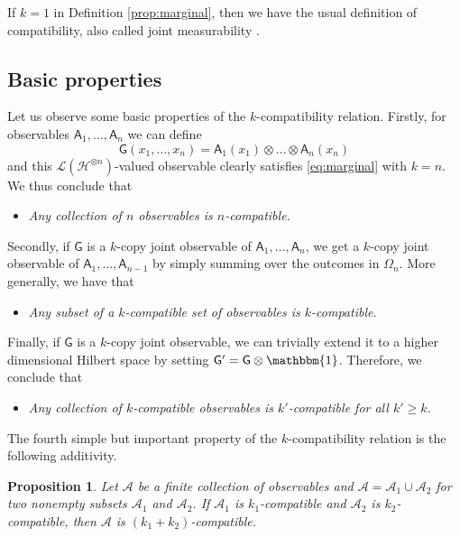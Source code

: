 \documentclass[12pt]{amsart}
\newtheorem{proposition}{Proposition}
\theoremstyle{definition}
\newcommand{\hh}{\mathcal{H}} %
\newcommand{\elle}[1]{\mathcal{L}(#1)} %
\newcommand{\id}{\mathbbm{1}} %
\newcommand{\A}{\mathsf{A}}%
\newcommand{\G}{\mathsf{G}}%
\begin{document}
If $k=1$ in Definition \ref{prop:marginal}, then we have the usual definition of compatibility, also called joint measurability \cite{Lahti03}.

\subsection{Basic properties}

 
Let us observe some basic properties of the $k$-compatibility relation.
Firstly, for observables $\A_1,\ldots,\A_n$ we can define
\begin{equation}
\label{eq:kcompJM}
\G(x_1,\ldots,x_n) = \A_1(x_1) \otimes \ldots \otimes \A_n(x_n)
\end{equation}
and this $\elle{\hh^{\otimes n}}$-valued observable clearly satisfies \eqref{eq:marginal} with $k=n$.
We thus conclude that
\begin{itemize}[leftmargin=*,labelsep=4mm]
\item \emph{Any collection of $n$ observables is $n$-compatible.}
\end{itemize}
Secondly, if $\G$ is a $k$-copy joint observable of $\A_1,\ldots,\A_n$, we get a $k$-copy joint observable of $\A_1,\ldots,\A_{n-1}$ by simply summing over the outcomes in $\Omega_n$.
More generally, we have that
\begin{itemize}[leftmargin=*,labelsep=4mm]
\item \emph{Any subset of a $k$-compatible set of observables is $k$-compatible}.
\end{itemize}
 Finally, if $\G$ is a $k$-copy joint observable, we can trivially extend it to a higher dimensional Hilbert space by setting $\G' = \G \otimes \id$.
Therefore, we conclude that
\begin{itemize}[leftmargin=*,labelsep=4mm]
\item \emph{Any collection of $k$-compatible observables is $k'$-compatible for all $k'\geq k$.}
\end{itemize}

The fourth simple but important property of the $k$-compatibility relation is the following additivity.

\begin{proposition}\label{prop:division}
Let $\mathcal{A}$ be a finite collection of observables and $\mathcal{A}=\mathcal{A}_1 \cup \mathcal{A}_2$ for two nonempty subsets $\mathcal{A}_1$ and $\mathcal{A}_2$.
If $\mathcal{A}_1$ is $k_1$-compatible and $\mathcal{A}_2$ is $k_2$-compatible, then $\mathcal{A}$ is $(k_1+k_2)$-compatible.
\end{proposition}
\end{document}
